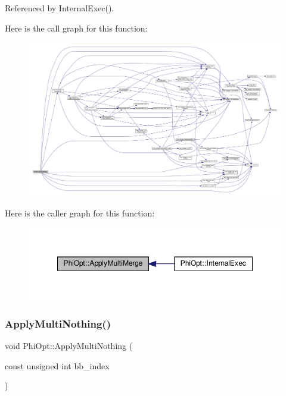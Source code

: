 Referenced by Internal\+Exec().

Here is the call graph for this function\+:
\nopagebreak
\begin{figure}[H]
\begin{center}
\leavevmode
\includegraphics[width=350pt]{dc/ddf/classPhiOpt_ae4b11dc6285655c89d79ef38bb635374_cgraph}
\end{center}
\end{figure}
Here is the caller graph for this function\+:
\nopagebreak
\begin{figure}[H]
\begin{center}
\leavevmode
\includegraphics[width=348pt]{dc/ddf/classPhiOpt_ae4b11dc6285655c89d79ef38bb635374_icgraph}
\end{center}
\end{figure}
\mbox{\label{classPhiOpt_a7e227327f0aaa8d0714b5bf0ca4354ab}} 
\subsubsection{\texorpdfstring{Apply\+Multi\+Nothing()}{ApplyMultiNothing()}}
{\footnotesize\ttfamily void Phi\+Opt\+::\+Apply\+Multi\+Nothing (\begin{DoxyParamCaption}\item[{const unsigned int}]{bb\+\_\+index }\end{DoxyParamCaption})\hspace{0.3cm}{\ttfamily [private]}}



